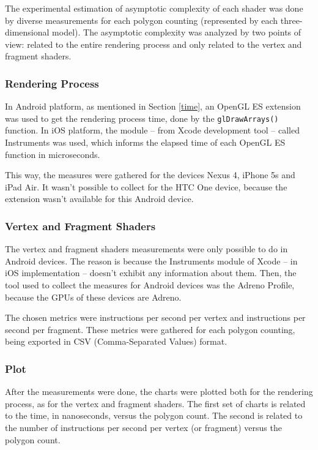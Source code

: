 \documentclass[10pt, conference, compsocconf]{IEEEtran}
\begin{document}
{The experimental estimation of asymptotic complexity of each shader
was done by diverse measurements for each polygon counting (represented by each three-dimensional model). The
asymptotic complexity was analyzed by two points of view: related to the
entire rendering process and only related to the vertex and fragment shaders.

\subsubsection{Rendering Process}

In Android platform, as mentioned in Section \ref{time}, an OpenGL ES extension
was used to get the rendering process time, done by the \texttt{glDrawArrays()}
function. In iOS platform, the module -- from Xcode development tool -- called Instruments was used, 
which informs the elapsed time of each OpenGL ES function in microseconds.

 This way, the measures were gathered for the devices Nexus 4, iPhone 5s and
iPad Air. It wasn't possible to collect for the HTC One device, because the extension
wasn't available for this Android device.

\subsubsection{Vertex and Fragment Shaders}

The vertex and fragment shaders measurements were only possible to do in
Android devices. The reason is because the Instruments module of Xcode -- in iOS implementation -- doesn't exhibit
any information about them. Then, the tool used to collect the measures for Android devices was the
Adreno Profile, because the GPUs of these devices are Adreno. 

 The chosen metrics were instructions per second per vertex and instructions
per second per fragment. These metrics were gathered for each polygon counting,
being exported in CSV (Comma-Separated Values) format.

\subsubsection{Plot}

After the measurements were done, the charts were plotted both for the 
rendering process, as for the vertex and fragment shaders. The first set of charts is related to the time, 
in nanoseconds, versus the polygon count. The second is related to the number of instructions per second
per vertex (or fragment) versus the polygon count. 

}
\end{document}
